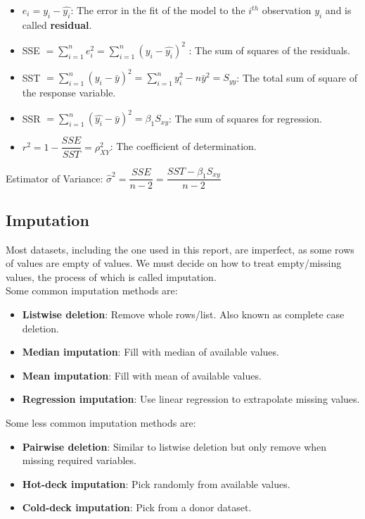 \begin{itemize}
  \item $e_i = y_i - \hat{y_i}$: The error in the fit of the model to the $i^{th}$ observation $y_i$ and is called \textbf{residual}.
  \item SSE $\displaystyle = \sum_{i=1}^{n} e_i^2 = \sum_{i=1}^{n} (y_i - \hat{y_i})^2 $ : The sum of squares of the residuals.
  \item SST $\displaystyle = \sum_{i=1}^{n}(y_i - \bar{y})^2 = \sum_{i=1}^{n}y_i^2 - n\bar{y}^2 = S_{yy}$: The total sum of square of the response variable.
  \item SSR $\displaystyle = \sum_{i=1}^{n}(\hat{y_i} - \bar{y})^2 = \beta_1S_{xy}$: The sum of squares for regression.
  \item $r^2 = 1 - \dfrac{SSE}{SST} = \rho_{XY}^2$: The coefficient of determination.
\end{itemize}
Estimator of Variance: $ \hat{\sigma}^2 = \dfrac{SSE}{n-2} = \dfrac{SST - \beta_1S_{xy}}{n-2} $

\subsection{Imputation}

Most datasets, including the one used in this report, are imperfect, as some rows of values are empty of values. We must decide on how to treat empty/missing values, the process of which is called imputation.\\

Some common imputation methods are:
\begin{itemize}
    \item \textbf{Listwise deletion}: Remove whole rows/list. Also known as complete case deletion.
    \item \textbf{Median imputation}: Fill with median of available values.
    \item \textbf{Mean imputation}: Fill with mean of available values.
    \item \textbf{Regression imputation}: Use linear regression to extrapolate missing values.
\end{itemize}

Some less common imputation methods are:
\begin{itemize}
    \item \textbf{Pairwise deletion}: Similar to listwise deletion but only remove when missing required variables.
    \item \textbf{Hot-deck imputation}: Pick randomly from available values.
    \item \textbf{Cold-deck imputation}: Pick from a donor dataset.
\end{itemize}

